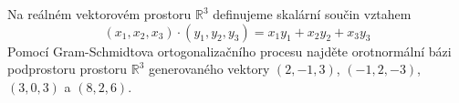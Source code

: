 Na reálném vektorovém prostoru $\mathbb{R}^{3}$ definujeme skalární součin
vztahem 
$$\left ( x_{1},x_{2},x_{3} \right )\cdot \left ( y_{1},y_{2},y_{3}
\right )=x_{1}y_{1}+x_{2}y_{2}+x_{3}y_{3}$$
Pomocí Gram-Schmidtova ortogonalizačního procesu najděte orotnormální bázi
podprostoru prostoru $\mathbb{R}^{3}$ generovaného vektory $(2,-1,3)$,
$(-1,2,-3)$, $(3,0,3)$ a $(8,2,6)$.
